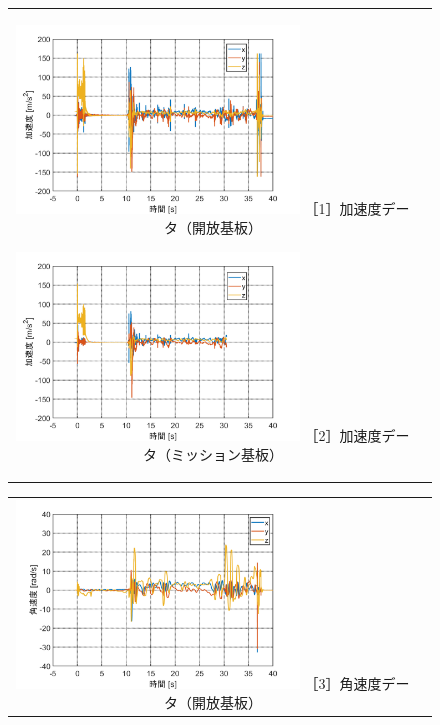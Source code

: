 \documentclass[a4paper,11pt,uplatex]{jsarticle}
\begin{document}
\begin{figure}[H]
	\begin{tabular}{cc}
		\begin{minipage}{.48\textwidth}
			\centering
			\includegraphics[width=75mm]{pic_sim/acc_no.png}
			\hspace{16mm} {\small［1］加速度データ（開放基板）}
		\end{minipage}
		\begin{minipage}{.48\textwidth}
			\centering
			\includegraphics[width=75mm]{pic_sim/acc_ta.png}
			\hspace{16mm} {\small［2］加速度データ（ミッション基板）}
		\end{minipage}
	\end{tabular}
	\begin{tabular}{cc}
		\begin{minipage}{.48\textwidth}
			\centering
			\includegraphics[width=75mm]{pic_sim/gyr_no.png}
			\hspace{16mm} {\small［3］角速度データ（開放基板）}
		\end{minipage}

\end{tabular}
\end{figure}
\end{document}
